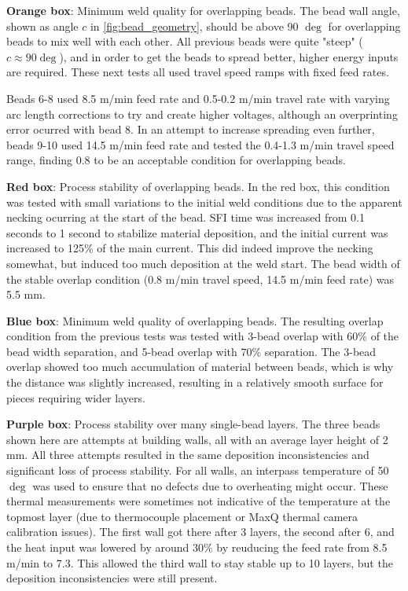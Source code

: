 \textbf{Orange box}: Minimum weld quality for overlapping beads.
The bead wall angle, shown as angle $c$ in \autoref{fig:bead_geometry}, should be above 90 $\deg$ for overlapping beads to mix well with each other. All previous beads were quite "steep" ($c \approx 90 \deg$), and in order to get the beads to spread better, higher energy inputs are required. These next tests all used travel speed ramps with fixed feed rates.

Beads 6-8 used 8.5 m/min feed rate and 0.5-0.2 m/min travel rate with varying arc length corrections to try and create higher voltages, although an overprinting error ocurred with bead 8. In an attempt to increase spreading even further, beads 9-10 used 14.5 m/min feed rate and tested the 0.4-1.3 m/min travel speed range, finding 0.8 to be an acceptable condition for overlapping beads.

\textbf{Red box}: Process stability of overlapping beads.
In the red box, this condition was tested with small variations to the initial weld conditions due to the apparent necking ocurring at the start of the bead. SFI time was increased from 0.1 seconds to 1 second to stabilize material deposition, and the initial current was increased to 125\% of the main current.
This did indeed improve the necking somewhat, but induced too much deposition at the weld start. The bead width of the stable overlap condition (0.8 m/min travel speed, 14.5 m/min feed rate) was 5.5 mm.

\textbf{Blue box}: Minimum weld quality of overlapping beads.
The resulting overlap condition from the previous tests was tested with 3-bead overlap with 60\% of the bead width separation, and 5-bead overlap with 70\% separation. The 3-bead overlap showed too much accumulation of material between beads, which is why the distance was slightly increased, resulting in a relatively smooth surface for pieces requiring wider layers.

\textbf{Purple box}: Process stability over many single-bead layers. The three beads shown here are attempts at building walls, all with an average layer height of 2 mm. All three attempts resulted in the same deposition inconsistencies and significant loss of process stability.
For all walls, an interpass temperature of 50$\deg$ was used to ensure that no defects due to overheating might occur. These thermal measurements were sometimes not indicative of the temperature at the topmost layer (due to thermocouple placement or MaxQ thermal camera calibration issues).
The first wall got there after 3 layers, the second after 6, and the heat input was lowered by around 30\% by reuducing the feed rate from 8.5 m/min to 7.3. This allowed the third wall to stay stable up to 10 layers, but the deposition inconsistencies were still present.

